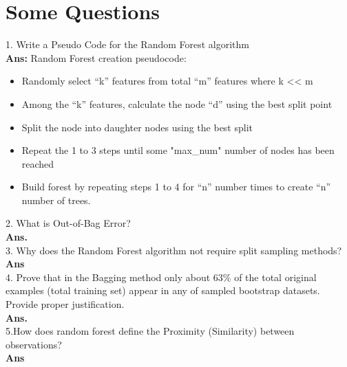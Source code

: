 \documentclass[a4paper, 11pt]{article}
\begin{document}
\section{Some Questions}
1. Write a Pseudo Code for the Random Forest algorithm\\
\textbf{Ans: }Random Forest creation pseudocode:
\begin{itemize}
  \item Randomly select “k” features from total “m” features where k << m
  \item Among the “k” features, calculate the node “d” using the best split point
  \item Split the node into daughter nodes using the best split
  \item Repeat the 1 to 3 steps until some "max\_num" number of nodes has been reached
  \item Build forest by repeating steps 1 to 4 for “n” number times to create “n” number of trees.
\end{itemize}
2. What is Out-of-Bag Error?\\
\textbf{Ans.} \\
3.  Why does the Random Forest algorithm not require split sampling
methods?\\ 
\textbf{Ans} \\
4. Prove that in the Bagging method only about 63\% of the total
original examples (total training set) appear in any of sampled
bootstrap datasets. Provide proper justification. \\
\textbf{Ans.}  \\         
5.How does random forest define the Proximity (Similarity) between
observations?\\
\textbf{Ans} \\

\end{document}
